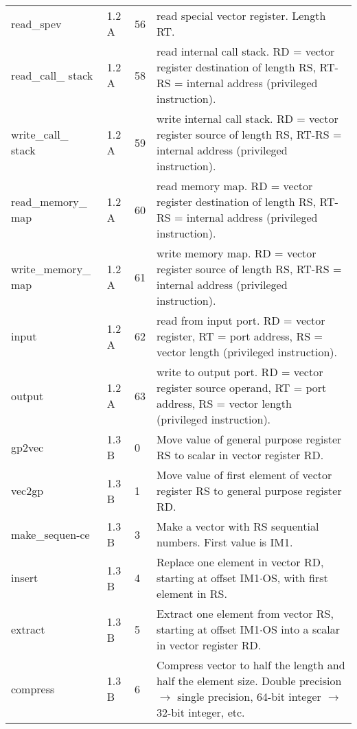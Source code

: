 \documentclass[forwardcom.tex]{subfiles}
\begin{document}
\begin{longtable} {|p{25mm}|p{14mm}|p{10mm}|p{95mm}|}
read\_spev    & 1.2 A & 56 & read special vector register. Length RT. \\
read\_call\_ stack & 1.2 A & 58 & read internal call stack. RD = vector register destination of length RS, RT-RS = internal address (privileged instruction). \\
write\_call\_ stack & 1.2 A & 59 & write internal call stack. RD = vector register source of length RS, RT-RS = internal address (privileged instruction). \\

read\_memory\_ map & 1.2 A & 60 & read memory map. RD = vector register destination of length RS, RT-RS = internal address (privileged instruction). \\
write\_memory\_ map & 1.2 A & 61 & write memory map. RD = vector register source of length RS, RT-RS = internal address (privileged instruction). \\

input         & 1.2 A & 62 & read from input port. RD = vector register, RT = port address, RS = vector length (privileged instruction). \\
output        & 1.2 A & 63 & write to output port. RD = vector register source operand, RT = port address, RS = vector length (privileged instruction). \\

gp2vec        & 1.3 B &  0 & Move value of general purpose register RS to scalar in vector register RD. \\

vec2gp        & 1.3 B &  1 & Move value of first element of vector register RS to general purpose register RD. \\

make\_sequen-ce& 1.3 B & 3 & Make a vector with RS sequential numbers. First value is IM1. \\

insert        & 1.3 B &  4 & Replace one element in vector RD, starting at offset IM1$\cdot$OS, with first element in RS. \\

extract       & 1.3 B & 5 & Extract one element from vector RS, starting at offset IM1$\cdot$OS into a scalar in vector register RD. \\

compress      & 1.3 B  &  6 & Compress vector to half the length and half the element size. Double precision $\rightarrow$ single precision, 64-bit
integer $\rightarrow$ 32-bit integer, etc. \\


\end{longtable}
\end{document}
